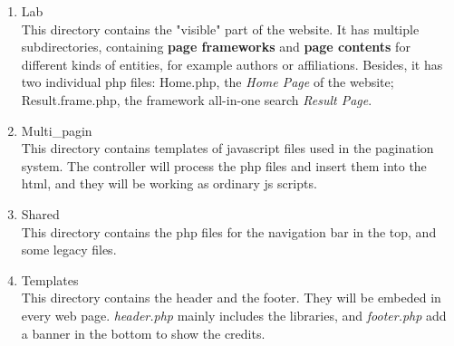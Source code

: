 \documentclass[a4paper, 10pt]{article}
\begin{document}
\begin{enumerate}
\item Lab\\
  This directory contains the "visible" part of the website. It has multiple subdirectories, containing \textbf{page frameworks} and \textbf{page contents} for different kinds of entities, for example authors or affiliations. Besides, it has two individual php files: Home.php, the \textit{Home Page} of the website; Result.frame.php, the framework all-in-one search \textit{Result Page}.
\item Multi\_pagin\\
  This directory contains templates of javascript files used in the pagination system. The controller will process the php files and insert them into the html, and they will be working as ordinary js scripts.
\item Shared\\
  This directory contains the php files for the navigation bar in the top, and some legacy files.
\item Templates\\
  This directory contains the header and the footer. They will be embeded in every web page. \textit{header.php} mainly includes the libraries, and \textit{footer.php} add a banner in the bottom to show the credits.
\end{enumerate}
\end{document}
